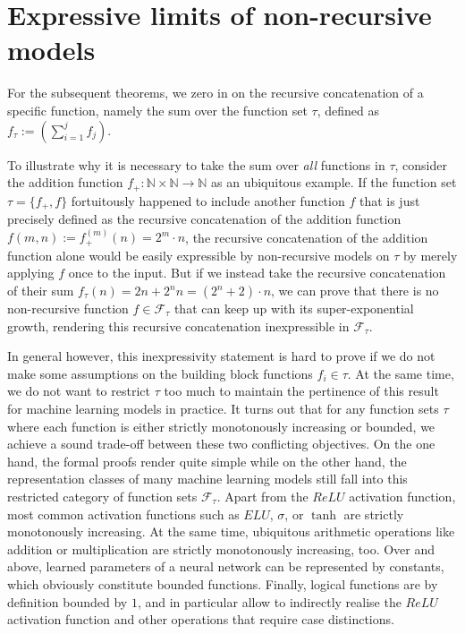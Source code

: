 \section{Expressive limits of non-recursive models}
\label{sec:expressive-limits-non-recursive-models}
For the subsequent theorems, we zero in on the recursive concatenation of a specific function, namely the sum over the function set $\tau$, defined as $f_{\tau}:=\left(\sum_{i=1}^{j}f_j\right)$.

To illustrate why it is necessary to take the sum over \textit{all} functions in $\tau$, consider the addition function $f_{+}:\mathbb{N}\times \mathbb{N}\to\mathbb{N}$ as an ubiquitous example.
If the function set $\tau=\{f_{+},f\}$ fortuitously happened to include another function $f$ that is just precisely defined as the recursive concatenation of the addition function $f(m,n):=f_{+}^{(m)}(n)=2^{m}\cdot n$, the recursive concatenation of the addition function alone would be easily expressible by non-recursive models on $\tau$ by merely applying $f$ once to the input.
But if we instead take the recursive concatenation of their sum $f_{\tau}(n)=2n+2^{n} n = (2^{n}+2)\cdot n$, we can prove that there is no non-recursive function $f\in\mathcal{F}_{\tau}$ that can keep up with its super-exponential growth, rendering this recursive concatenation inexpressible in $\mathcal{F}_\tau$.

In general however, this inexpressivity statement is hard to prove if we do not make some assumptions on the building block functions $f_i\in\tau$.
At the same time, we do not want to restrict $\tau$ too much to maintain the pertinence of this result for machine learning models in practice.
It turns out that for any function sets $\tau$ where each function is either strictly monotonously increasing or bounded, we achieve a sound trade-off between these two conflicting objectives.
On the one hand, the formal proofs render quite simple while on the other hand, the representation classes of many machine learning models still fall into this restricted category of function sets $\mathcal{F}_{\tau}$.
Apart from the $ReLU$ activation function, most common activation functions such as $ELU$, $\sigma$, or $\tanh$ are strictly monotonously increasing. At the same time, ubiquitous arithmetic operations like addition or multiplication are strictly monotonously increasing, too.
Over and above, learned parameters of a neural network can be represented by constants, which obviously constitute bounded functions.
Finally, logical functions are by definition bounded by $1$, and in particular allow to indirectly realise the $ReLU$ activation function and other operations that require case distinctions.

